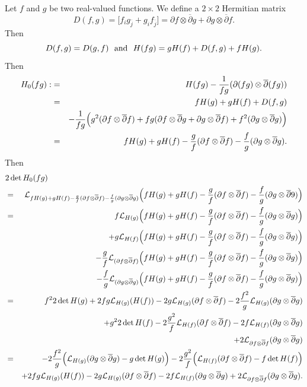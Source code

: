 \documentclass[12pt]{amsart}
\def\d{\partial}
\def\jbar{\overline{j}}
\def\dbar{\overline{\partial}}
\def\d{\partial}
\def\cal{\mathcal}
\begin{document}
Let $f$ and $g$ be two real-valued functions. We define a $2\times 2$ Hermitian matrix
\begin{equation}
D(f, g)=\Big[ f_i g_{\jbar}+g_i f_{\jbar}\Big]=\d f\otimes \dbar g+\d g\otimes \dbar f.
\end{equation}
Then
\begin{equation}
D(f, g)=D(g,f) \ \hbox{ and }\ H(f g)=g H(f)+D(f, g)+f H(g).
\end{equation}
Then
\begin{eqnarray*}
H_0(fg):&=&H(fg)-{1\over fg} (\d(fg)\otimes \dbar(fg))\\
&=&fH(g)+gH(f)+D(f,g)\\
&&-{1\over fg}\Big(g^2(\d f\otimes \dbar f)+fg(\d f\otimes \dbar g+\d g \otimes \dbar f)+f^2(\d g\otimes \dbar g)\Big)\\
&=&fH(g)+gH(f)
-{g\over f} ( \d f\otimes \dbar f)-{f\over g} (\d g\otimes \dbar g).
\end{eqnarray*}
Then
\begin{eqnarray*}
\lefteqn{2\det H_0(fg)}\\
&=&{\cal L}_{fH(g)+gH(f)
-{g\over f} ( \d f\otimes \dbar f)-{f\over g} (\d g\otimes \dbar g)} \Big( fH(g)+gH(f)
-{g\over f} ( \d f\otimes \dbar f)-{f\over g} (\d g\otimes \dbar 9)\Big)\\
&=&f {\cal L}_{H(g)} \Big( fH(g)+gH(f)
-{g\over f} ( \d f\otimes \dbar f)-{f\over g} (\d g\otimes \dbar g)\Big)\\
&&+g {\cal L}_{H(f)} \Big( fH(g)+gH(f)
-{g\over f} ( \d f\otimes \dbar f)-{f\over g} (\d g\otimes \dbar g)\Big) \\
&&-{g \over f} {\cal L}_{( \d f\otimes \dbar f)} \Big( fH(g)+gH(f)
-{g \over f} ( \d f\otimes \dbar f)-{f\over g} (\d g\otimes \dbar g)\Big)\\
&&-{f \over g} {\cal L}_{ (\d g\otimes \dbar g)} \Big( fH(g)+gH(f)
-{g \over f} ( \d f\otimes \dbar f)-{f\over g} (\d g\otimes \dbar g)\Big)\\
&=&f^2 2\det H(g) +2fg {\cal L}_{H(g)}(H(f))-2g{\cal L}_{H(g)}(\d f\otimes \dbar f)-2{f^2\over g} {\cal L}_{H(g)}(\d g\otimes \dbar g)\\
&&+g^2 2 \det H(f)-2{g^2\over f} {\cal L}_{H(f)}(\d f\otimes \dbar f)-2f{\cal L}_{H(f)}(\d g \otimes \dbar g)\\
&&+2{\cal L}_{\d f\otimes \dbar f}(\d g\otimes \dbar g)\\
&=&-2{f^2\over g}\Big( {\cal L}_{H(g)}(\d g\otimes \dbar g) -g\det H(g) \Big)
-2{g^2\over f} \Big({\cal L}_{H(f)}(\d f\otimes \dbar f)-f \det H(f)\Big)\\
&&+2fg {\cal L}_{H(g)}(H(f))-2g{\cal L}_{H(g)}(\d f\otimes \dbar f)-2f{\cal L}_{H(f)}(\d g \otimes \dbar g)
+2{\cal L}_{\d f\otimes \dbar f}(\d g\otimes \dbar g).
\end{eqnarray*}
\end{document}
